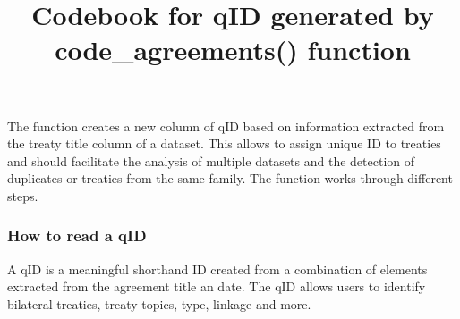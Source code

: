 \documentclass[
]{article}
\title{Codebook for qID generated by code\_agreements() function}
\author{}
\date{\vspace{-2.5em}}
\begin{document}
\maketitle

The function creates a new column of qID based on information extracted
from the treaty title column of a dataset. This allows to assign unique
ID to treaties and should facilitate the analysis of multiple datasets
and the detection of duplicates or treaties from the same family. The
function works through different steps.

\hypertarget{how-to-read-a-qid}{%
\subsubsection{How to read a qID}\label{how-to-read-a-qid}}

A qID is a meaningful shorthand ID created from a combination of
elements extracted from the agreement title an date. The qID allows
users to identify bilateral treaties, treaty topics, type, linkage and
more.
\end{document}
